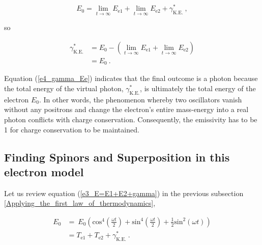 \documentclass[%
 reprint,
 amsmath,amssymb,
 aps,
]{revtex4-1}
\numberwithin{equation}{section}%
\begin{document}
        \begin{equation}
            E_{0} = \lim_{t \to \infty} E_{\mathrm{e1}} + \lim_{t \to \infty} E_{\mathrm{e2}} + \gamma^{*}_\mathrm{K.E.}
            \ ,
        \end{equation}
        
    so
        
        \begin{equation}
            \begin{split}
                \gamma^{*}_{\mathrm{K.E.}}
                    &= E_{0} - \left( \lim_{t \to \infty} E_{\mathrm{e1}} + \lim_{t \to \infty} E_{\mathrm{e2}} \right) \\
                    &= E_{0}
                    \ .
                \label{e4_gamma_Ee}
            \end{split}
        \end{equation}

    Equation (\ref{e4_gamma_Ee}) indicates that the final outcome is a photon because the total energy of the virtual photon, $\gamma^{*}_\mathrm{K.E.}$, is ultimately the total energy of the electron $E_{0}$. In other words, the phenomenon whereby two oscillators vanish without any positrons and change the electron's entire mass-energy into a real photon conflicts with charge conservation. Consequently, the emissivity has to be 1 for charge conservation to be maintained.



\subsection{Finding Spinors and Superposition in this electron model}
\label{Finding_spinors_and_superposition_in_this_electron_Model}


    Let us review equation (\ref{e3_E=E1+E2+gamma}) in the previous subsection \ref{Applying_the_first_law_of_thermodynamics},

        \begin{equation}
            \begin{split}
                E_{0}
                    &= \ E_{0} \left( \mathrm{cos}^{4} \left( \frac{\omega t}{2} \right) + \mathrm{sin}^{4} \left( \frac{\omega t}{2} \right) + \frac{1}{2} \mathrm{sin}^{2} (\omega t) \right) \\
                    &= T_{\mathrm{e1}} + T_{\mathrm{e2}} + \gamma^{*}_\mathrm{K.E.}
                    \ .
            \end{split}
            \label{e3_E=E1+E2+gamma_again}
        \end{equation}
\end{document}
